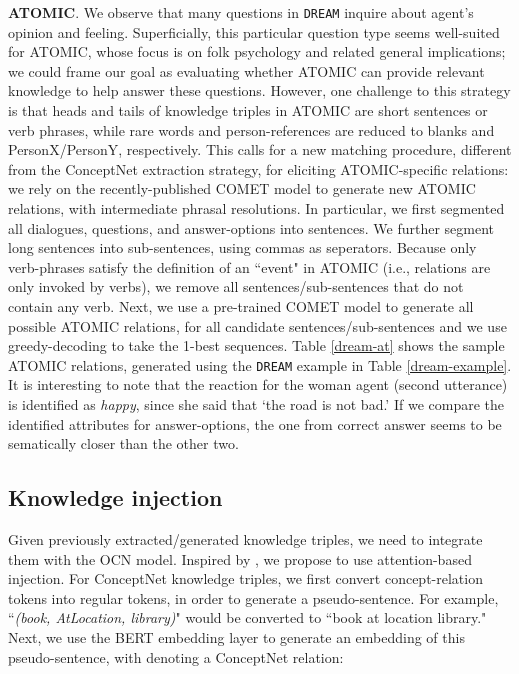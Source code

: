 \documentclass[11pt,a4paper]{article}
\begin{document}
\noindent
\textbf{ATOMIC}. We observe that many questions in \texttt{DREAM} inquire about agent's opinion and feeling. Superficially, this particular question type seems well-suited for ATOMIC, whose focus is on folk psychology and related general implications; we could frame our goal as evaluating whether ATOMIC can provide relevant knowledge to help answer these questions. However, one challenge to this strategy is that heads and tails of knowledge triples in ATOMIC are short sentences or verb phrases, while rare words and person-references are reduced to blanks and PersonX/PersonY, respectively. This calls for a new matching procedure, different from the ConceptNet extraction strategy, for eliciting ATOMIC-specific relations: we rely on the recently-published COMET model \cite{bosselut-etal-2019-comet} to generate new ATOMIC relations, with intermediate phrasal resolutions. In particular, we first segmented all dialogues, questions, and answer-options into sentences. We further segment long sentences into sub-sentences, using commas as seperators. Because only verb-phrases satisfy the definition of an ``event" in ATOMIC (i.e., relations are only invoked by verbs), we remove all sentences/sub-sentences that do not contain any verb. Next, we use a pre-trained COMET model \cite{bosselut-etal-2019-comet} to generate all possible ATOMIC relations, for all candidate sentences/sub-sentences and we use greedy-decoding to take the 1-best sequences. Table \ref{dream-at} shows the sample ATOMIC relations, generated using the \texttt{DREAM} example in Table \ref{dream-example}. It is interesting to note that the reaction for the woman agent (second utterance) is identified as \textit{happy}, since she said that `the road is not bad.' If we compare the identified attributes for answer-options, the one from correct answer seems to be sematically closer than the other two. 


\subsection{Knowledge injection}
Given previously extracted/generated knowledge triples, we need to integrate them with the OCN model. Inspired by \citet{bauer-etal-2018-commonsense}, we propose to use attention-based injection. For ConceptNet knowledge triples, we first convert concept-relation tokens into regular tokens, in order to generate a pseudo-sentence. For example, ``\textit{(book, AtLocation, library)}" would be converted to ``book at location library." Next, we use the BERT embedding layer to generate an embedding of this pseudo-sentence, with  denoting a ConceptNet relation:
\end{document}
